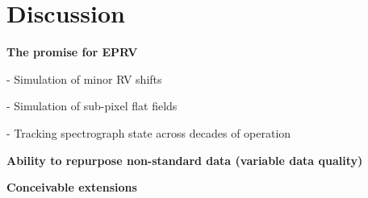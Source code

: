 \documentclass[twocolumn]{aastex63}
\begin{document}
\section{Discussion}
\begin{mdframed}
  \textbf{The promise for EPRV} \par
  - Simulation of minor RV shifts\par
  - Simulation of sub-pixel flat fields \par
  - Tracking spectrograph state across decades of operation\par
  \textcolor{lightgray}{\lipsum[14]}
\end{mdframed}


\begin{mdframed}
  \textbf{Ability to repurpose non-standard data (variable data quality)} \par
  \textcolor{lightgray}{\lipsum[15]}
\end{mdframed}


\begin{mdframed}
  \textbf{Conceivable extensions} \par
  \textcolor{lightgray}{\lipsum[16]}
\end{mdframed}



\acknowledgements






\clearpage



\end{document}
